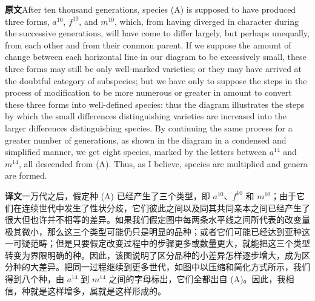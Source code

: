 \documentclass[UTF8,zihao=-4]{ctexart}
\newcommand{\BodyFont}{\fontsize{10.5pt}{15.5pt}\selectfont}
\newcommand{\origlabel}{\textbf{原文}\quad}
\newcommand{\translabel}{\textbf{译文}\quad}
\newenvironment{enblock}{\par\noindent\begingroup\BodyFont\origlabel}{\par\endgroup}
\newenvironment{zhblock}{\par\noindent\begingroup\BodyFont\translabel}{\par\endgroup\vspace{0.35em}}
\newcommand{\pair}[2]{\begin{enblock}#1\end{enblock}\begin{zhblock}#2\end{zhblock}}
\begin{document}
\pair{After ten thousand generations, species (A) is supposed to have produced three forms, $a^{10}$, $f^{10}$, and $m^{10}$, which, from having diverged in character during the successive generations, will have come to differ largely, but perhaps unequally, from each other and from their common parent. If we suppose the amount of change between each horizontal line in our diagram to be excessively small, these three forms may still be only well-marked varieties; or they may have arrived at the doubtful category of subspecies; but we have only to suppose the steps in the process of modification to be more numerous or greater in amount to convert these three forms into well-defined species: thus the diagram illustrates the steps by which the small differences distinguishing varieties are increased into the larger differences distinguishing species. By continuing the same process for a greater number of generations, as shown in the diagram in a condensed and simplified manner, we get eight species, marked by the letters between $a^{14}$ and $m^{14}$, all descended from (A). Thus, as I believe, species are multiplied and genera are formed.}{一万代之后，假定种 (A) 已经产生了三个类型，即 $a^{10}$、$f^{10}$ 和 $m^{10}$；由于它们在连续世代中发生了性状分歧，它们彼此之间以及同其共同亲本之间已经产生了很大但也许并不相等的差异。如果我们假定图中每两条水平线之间所代表的改变量极其微小，那么这三个类型可能仍只是明显的品种；或者它们可能已经达到亚种这一可疑范畴；但是只要假定改变过程中的步骤更多或数量更大，就能把这三个类型转变为界限明确的种。因此，该图说明了区分品种的小差异怎样逐步增大，成为区分种的大差异。把同一过程继续到更多世代，如图中以压缩和简化方式所示，我们得到八个种，由 $a^{14}$ 到 $m^{14}$ 之间的字母标出，它们全都出自 (A)。因此，我相信，种就是这样增多，属就是这样形成的。}
\end{document}
